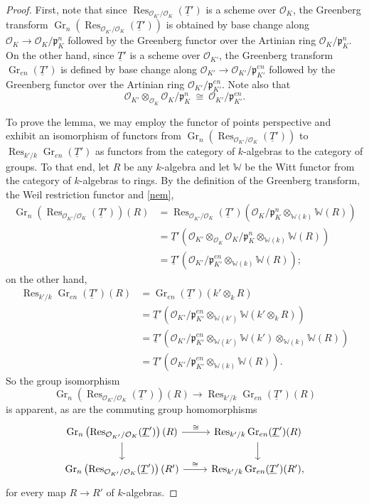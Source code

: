 \documentclass[11pt]{amsart}
\theoremstyle{plain}
\theoremstyle{definition}
\theoremstyle{remark}
\newcommand{\OK}{\mathcal{O}_K}
\newcommand{\pK}{\mathfrak{p}_K}
\newcommand{\OKp}{\mathcal{O}_{K'}}
\newcommand{\pKp}{\mathfrak{p}_{K'}}
\newcommand{\Fq}{k}
\newcommand{\WW}{\mathbb{W}}
\DeclareMathOperator{\Gr}{Gr}
\DeclareMathOperator{\Res}{Res}
\newcommand{\iso}{{\ \cong\ }}
\newcommand{\TTp}{\underline{T}'}
\begin{document}
\begin{proof}
First, note that since $\Res_{\OKp/\OK}(\TTp)$ 
is a scheme over $\OK$, 
the Greenberg transform $\Gr_{n}\left( \Res_{\OKp/\OK}(\TTp)\right)$ 
is obtained by base change along $\OK \to \OK/\pK^n$ 
followed by the Greenberg functor over the Artinian ring $\OK/\pK^n$. 
On the other hand, since $\TTp$ is a scheme over $\OKp$, 
the Greenberg transform $\Gr_{en}(\TTp)$ is defined by base change along 
$\OKp \to \OKp/\pKp^{en}$ 
followed by the Greenberg functor over the Artinian ring $\OKp/\pKp^{en}$. 
Note also that 
\begin{equation}\label{nem}
\OKp \otimes_{\OK} \OK/\pK^n \iso \OKp/\pKp^{en}.
\end{equation}

To prove the lemma, we may employ the functor of points perspective 
and exhibit an isomorphism of functors from 
$\Gr_{n}\left( \Res_{\OKp/\OK}(\TTp)\right)$ 
to $\Res_{k'/k} \Gr_{en}(\TTp)$ as functors 
from the category of $\Fq$-algebras to the category of groups.
To that end, let $R$ be any $\Fq$-algebra and 
let $\WW$ be the Witt functor from the category of $\Fq$-algebras to rings. 
By the definition of the Greenberg transform, the Weil restriction functor and \eqref{nem},
\[
\begin{aligned}
\Gr_{n}\left( \Res_{\OKp/\OK}(\TTp)\right)(R)
&= \Res_{\OKp/\OK}(\TTp)\left( \OK/\pK^n \otimes_{\WW(k)} \WW(R)\right)\\
&= \TTp\left(\OKp \otimes_{\OK} \OK/\pK^n \otimes_{\WW(k)} \WW(R)\right)\\
&= \TTp\left(\OKp /\pKp^{en} \otimes_{\WW(k)} \WW(R)\right);
\end{aligned}
\]
on the other hand,
\[
\begin{aligned}
\Res_{k'/k} \Gr_{en}(\TTp)(R)
&= \Gr_{en}(\TTp) (k'\otimes_{k} R)\\
&= \TTp\left( \OKp /\pKp^{en} \otimes_{\WW(k')} \WW(k'\otimes_{k} R)\right)\\
&= \TTp\left( \OKp /\pKp^{en} \otimes_{\WW(k')} \WW(k') \otimes_{\WW(k)} \WW(R)\right)\\
&= \TTp\left( \OKp /\pKp^{en} \otimes_{\WW(k)} \WW(R)\right).
\end{aligned}
\]
So the group isomorphism 
\[
\Gr_{n}\left( \Res_{\OKp/\OK}(\TTp)\right)(R) \to \Res_{k'/k} \Gr_{en}(\TTp)(R)
\]
is apparent, as are the commuting group homomorphisms
\[
\begin{tikzcd}
\arrow{d} \Gr_{n}\left( \Res_{\OKp/\OK}(\TTp)\right)(R) \arrow{r}{\iso} & \arrow{d} \Res_{k'/k} \Gr_{en}(\TTp)(R)\\
\Gr_{n}\left( \Res_{\OKp/\OK}(\TTp)\right)(R') \arrow{r}{\iso} & \Res_{k'/k} \Gr_{en}(\TTp)(R'),
\end{tikzcd}
\]
for every map $R\to R'$ of $\Fq$-algebras.
\end{proof}
\end{document}
